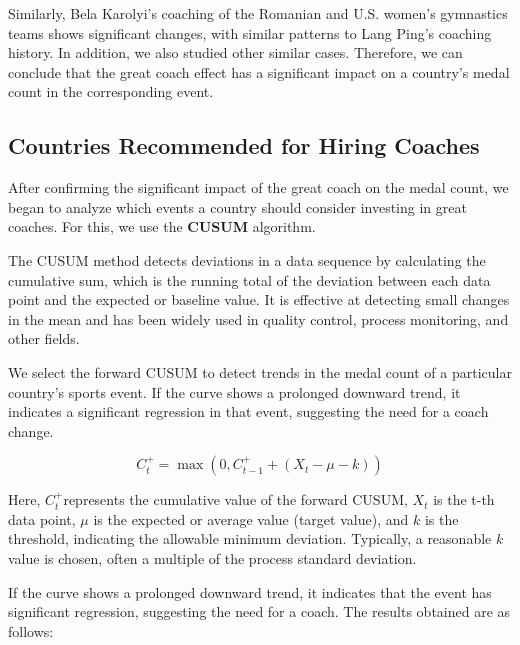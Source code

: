 \documentclass[12pt]{article}  %
\begin{document}
Similarly, Bela Karolyi's coaching of the Romanian and U.S. women's gymnastics teams shows significant changes, with similar patterns to Lang Ping's coaching history. In addition, we also studied other similar cases. Therefore, we can conclude that the great coach effect has a significant impact on a country's medal count in the corresponding event.


\subsection{Countries Recommended for Hiring Coaches}
After confirming the significant impact of the great coach on the medal count, we began to analyze which events a country should consider investing in great coaches. For this, we use the \textbf{CUSUM} algorithm.

The CUSUM method detects deviations in a data sequence by calculating the cumulative sum, which is the running total of the deviation between each data point and the expected or baseline value. It is effective at detecting small changes in the mean and has been widely used in quality control, process monitoring, and other fields.

We select the forward CUSUM to detect trends in the medal count of a particular country's sports event. If the curve shows a prolonged downward trend, it indicates a significant regression in that event, suggesting the need for a coach change.

\begin{equation}
	C_t^+ = \max(0, C_{t-1}^+ + (X_t - \mu - k))
\end{equation}

Here, $C_t^+ $represents the cumulative value of the forward CUSUM, $X_t$ is the t-th data point, $\mu$ is the expected or average value (target value), and $k$ is the threshold, indicating the allowable minimum deviation. Typically, a reasonable $k$ value is chosen, often a multiple of the process standard deviation.

If the curve shows a prolonged downward trend, it indicates that the event has significant regression, suggesting the need for a coach. The results obtained are as follows:
\end{document}
